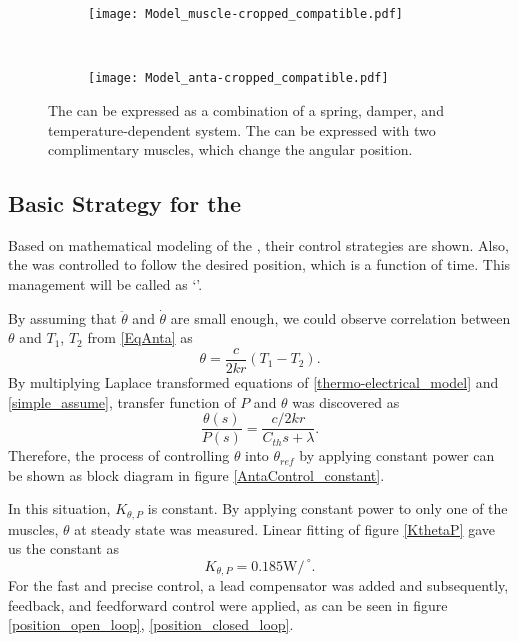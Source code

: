 \begin{figure}[t]
	\centering
	\begin{subfigure}[t]{0.3\textwidth}
		\centering\texttt{[image: Model\_muscle-cropped\_compatible.pdf]}
		\caption{\label{ModelMus}}
	\end{subfigure}
	~~
	\begin{subfigure}[t]{0.45\textwidth}
		\centering\texttt{[image: Model\_anta-cropped\_compatible.pdf]}
		\caption{\label{ModelAnt}}
	\end{subfigure}
	\caption[Modeling of the \scps and \anta]{ The \scps can be expressed as a combination of a spring, damper, and temperature-dependent system.  The \anta can be expressed with two complimentary muscles, which change the angular position.}
	\label{model}
\end{figure}



\subsection{Basic Strategy for the \APC}

Based on mathematical modeling of the \scpsnospace, their control strategies are shown. Also, the \anta was controlled to follow the desired position, which is a function of time. This management will be called as `\apcnospace'.

By assuming that $\ddot{\theta}$ and $\dot{\theta}$ are small enough, we could observe correlation between $\theta$ and $T_{1}$, $T_{2}$ from \eqref{EqAnta} as
\begin{equation} \label{simple_assume}
\theta = \frac{c}{2kr}(T_{1}-T_{2}).
\end{equation}
By multiplying Laplace transformed equations of \eqref{thermo-electrical_model} and \eqref{simple_assume}, transfer function of $P$ and $\theta$ was discovered as
\begin{equation} \label{apc_transfer}
\frac{\theta(s)}{P(s)} = \frac{c/2kr}{C_{th}s+\lambda}.
\end{equation}
Therefore, the process of controlling $\theta$ into $\theta_{ref}$ by applying constant power can be shown as block diagram in figure \ref{AntaControl_constant}. 

In this situation, $K_{\theta,P}$ is constant. By applying constant power to only one of the muscles, $\theta$ at steady state was measured. Linear fitting of figure \ref{KthetaP} gave us the constant as
\begin{equation}
K_{\theta,P} = 0.185\si{\watt}/^{\ \circ}. \nonumber
\end{equation}
For the fast and precise control, a lead compensator was added and subsequently, feedback, and feedforward control were applied, as can be seen in figure \ref{position_open_loop}, \ref{position_closed_loop}.

